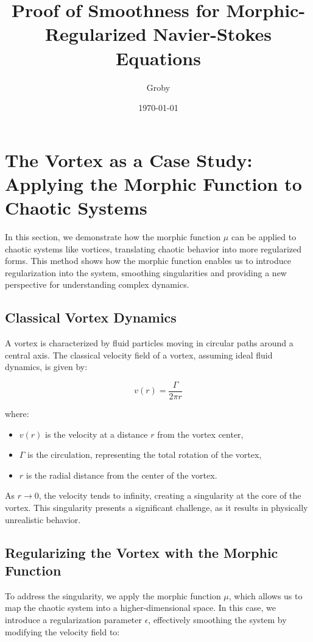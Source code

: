 \documentclass{article}
\title{Proof of Smoothness for Morphic-Regularized Navier-Stokes Equations}
\author{Groby}
\date{\today}
\begin{document}
\maketitle

\section*{The Vortex as a Case Study: Applying the Morphic Function to Chaotic Systems}

In this section, we demonstrate how the morphic function \( \mu \) can be applied to chaotic systems like vortices, translating chaotic behavior into more regularized forms. This method shows how the morphic function enables us to introduce regularization into the system, smoothing singularities and providing a new perspective for understanding complex dynamics.

\subsection*{Classical Vortex Dynamics}

A vortex is characterized by fluid particles moving in circular paths around a central axis. The classical velocity field of a vortex, assuming ideal fluid dynamics, is given by:

\[
v(r) = \frac{\Gamma}{2\pi r}
\]

where:
\begin{itemize}
    \item \( v(r) \) is the velocity at a distance \( r \) from the vortex center,
    \item \( \Gamma \) is the circulation, representing the total rotation of the vortex,
    \item \( r \) is the radial distance from the center of the vortex.
\end{itemize}

As \( r \to 0 \), the velocity tends to infinity, creating a singularity at the core of the vortex. This singularity presents a significant challenge, as it results in physically unrealistic behavior.

\subsection*{Regularizing the Vortex with the Morphic Function}

To address the singularity, we apply the morphic function \( \mu \), which allows us to map the chaotic system into a higher-dimensional space. In this case, we introduce a regularization parameter \( \epsilon \), effectively smoothing the system by modifying the velocity field to:
\end{document}
